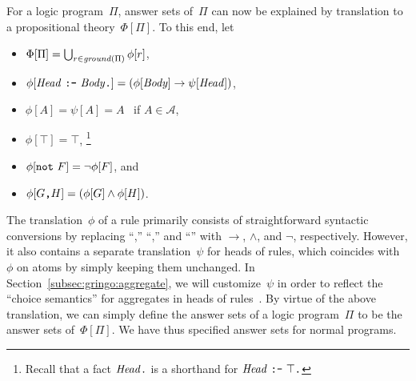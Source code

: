 For a logic program~$\Pi$, answer sets of~$\Pi$ can now be explained
by translation to a propositional theory~$\Phi[\Pi]$.
To this end, let
\begin{itemize}
\item $\Phi[\Pi] = \bigcup_{r\in\mathit{ground}(\Pi)}\phi[r]$,
\item $\phi[\mathit{Head}~\texttt{:-}~\mathit{Body}\texttt{.}] = 
       (\phi[\mathit{Body}]\rightarrow\psi[\mathit{Head}])$,
\item $\phi[A]=\psi[A]=A$ ~if $A\in\mathcal{A}$,
\item $\phi[\top]=\top$,%
\footnote{Recall that a fact $\mathit{Head}\texttt{.}$ is a shorthand for
          $\mathit{Head}~\texttt{:-}~\top\texttt{.}$}
\item $\phi[\texttt{not}~F] = \neg \phi[F]$, and
\item $\phi[G\texttt{,}H] = (\phi[G]\wedge\phi[H])$.
\end{itemize}
%
The translation~$\phi$ of a rule primarily consists of
straightforward syntactic conversions by replacing
``\code{:-},'' ``\code{,},'' and ``'' with
$\rightarrow$, $\wedge$, and $\neg$, respectively.
However, it also contains a separate translation~$\psi$ for heads of rules,
which coincides with~$\phi$ on atoms by simply keeping them unchanged.
In Section~\ref{subsec:gringo:aggregate},
we will customize~$\psi$ in order to reflect the
``choice semantics'' for aggregates in heads of rules~\cite{ferlif05a,siniso02a}.
By virtue of the above translation,
we can simply define the answer sets of a logic program~$\Pi$
to be the answer sets of~$\Phi[\Pi]$.
We have thus specified answer sets for normal programs.

